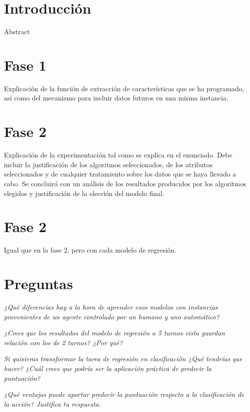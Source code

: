 \documentclass[12pt]{article}
\begin{document}
\tableofcontents

\newpage

\section*{Introducción}

\huge Abstract \small

\section{Fase 1}

Explicación de la función de extracción de características que se ha programado, así como del mecanismo para incluir datos futuros en una misma instancia.

\section{Fase 2}

Explicación de la experimentación tal como se explica en el enunciado. Debe incluir la justificación de los algoritmos seleccionados, de los atributos seleccionados y de cualquier tratamiento sobre los datos que se haya llevado a cabo. Se concluirá con un análisis de los resultados producidos por los algoritmos elegidos y justificación de la elección del modelo final.

\section{Fase 2}

Igual que en la fase 2, pero con cada modelo de regresión.

\section{Preguntas}

\emph{¿Qué diferencias hay a la hora de aprender esos modelos con instancias provenientes de un agente controlado por un humano y uno automático?}

\emph{¿Crees que los resultados del modelo de regresión a 5 turnos vista guardan relación con los de 2 turnos? ¿Por qué?}

\emph{Si quisieras transformar la tarea de regresión en clasificación ¿Qué tendrías que hacer? ¿Cuál crees que podría ser la aplicación práctica de predecir la puntuación?}

\emph{¿Qué ventajas puede aportar predecir la puntuación respecto a la clasificación de la acción? Justifica tu respuesta.}
\end{document}
